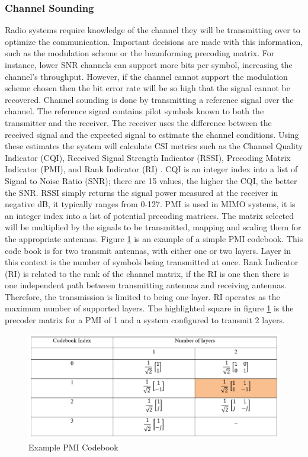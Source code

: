 \subsubsection{Channel Sounding}
Radio systems require knowledge of the channel they will be transmitting over to optimize the communication. Important decisions are made with this information, such as the modulation scheme or the beamforming precoding matrix. For instance, lower SNR channels can support more bits per symbol, increasing the channel's throughput. However, if the channel cannot support the modulation scheme chosen then the bit error rate will be so high that the signal cannot be recovered. Channel sounding is done by transmitting a reference signal over the channel. The reference signal contains pilot symbols known to both the transmitter and the receiver. The receiver uses the difference between the received signal and the expected signal to estimate the channel conditions. Using these estimates the system will calculate CSI metrics such as the Channel Quality Indicator (CQI), Received Signal Strength Indicator (RSSI), Precoding Matrix Indicator (PMI), and Rank Indicator (RI) \cite{Dahlman2018}. CQI is an integer index into a list of Signal to Noise Ratio (SNR); there are 15 values, the higher the CQI, the better the SNR. RSSI simply returns the signal power measured at the receiver in negative dB, it typically ranges from 0-127. PMI is used in MIMO systems, it is an integer index into a list of potential precoding matrices. The matrix selected will be multiplied by the signals to be transmitted, mapping and scaling them for the appropriate antennas. Figure \ref{fig:pmibook} is an example of a simple PMI codebook. This code book is for two transmit antennas, with either one or two layers. Layer in this context is the number of symbols being transmitted at once. Rank Indicator (RI) is related to the rank of the channel matrix, if the RI is one then there is one independent path between transmitting antennas and receiving antennas. Therefore, the transmission is limited to being one layer. RI operates as the maximum number of supported layers. The highlighted square in figure \ref{fig:pmibook} is the precoder matrix for a PMI of 1 and a system configured to transmit 2 layers.

\begin{figure}[H]
    \centering
    \includegraphics[width=15cm]{figures/PMI_Codebook.png}
    \caption{Example PMI Codebook \cite{Ryu2020}}
    \label{fig:pmibook}
\end{figure}

